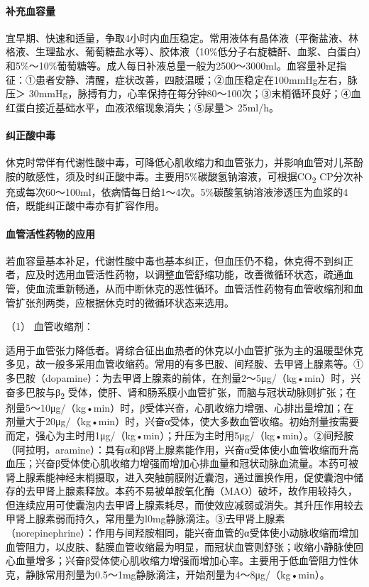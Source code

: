 \paragraph{补充血容量}

宜早期、快速和适量，争取4小时内血压稳定。常用液体有晶体液（平衡盐液、林格液、生理盐水、葡萄糖盐水等）、胶体液（10\%低分子右旋糖酐、血浆、白蛋白）和5\%～10\%葡萄糖等。成人每日补液总量一般为2500～3000ml。血容量补足指征：①患者安静、清醒，症状改善，四肢温暖；②血压稳定在100mmHg左右，脉压＞
30mmHg，脉搏有力，心率保持在每分钟80～100次；③末梢循环良好；④血红蛋白接近基础水平，血液浓缩现象消失；⑤尿量＞
25ml/h。

\paragraph{纠正酸中毒}

休克时常伴有代谢性酸中毒，可降低心肌收缩力和血管张力，并影响血管对儿茶酚胺的敏感性，须及时纠正酸中毒。主要用5\%碳酸氢钠溶液，可根据CO\textsubscript{2}
CP分次补充或每次60～100ml，依病情每日给1～4次。5\%碳酸氢钠溶液渗透压为血浆的4倍，既能纠正酸中毒亦有扩容作用。

\paragraph{血管活性药物的应用}

若血容量基本补足，代谢性酸中毒也基本纠正，但血压仍不稳，休克得不到纠正者，应及时选用血管活性药物，以调整血管舒缩功能，改善微循环状态，疏通血管，使血流重新畅通，从而中断休克的恶性循环。血管活性药物有血管收缩剂和血管扩张剂两类，应根据休克时的微循环状态来选用。

\hypertarget{text00223.htmlux5cux23CHP7-7-3-2-3-1}{}
（1） 血管收缩剂：

适用于血管张力降低者。肾综合征出血热者的休克以小血管扩张为主的温暖型休克多见，故一般多采用血管收缩药。常用的有多巴胺、间羟胺、去甲肾上腺素等。①多巴胺（dopamine）：为去甲肾上腺素的前体，在剂量2～5μg/（kg•min）时，兴奋多巴胺与β\textsubscript{2}
受体，使肝、肾和肠系膜小血管扩张，而脑与冠状动脉则扩张；在剂量5～10μg/（kg•min）时，β受体兴奋，心肌收缩力增强、心排出量增加；在剂量大于20μg/（kg•min）时，兴奋α受体，使大多数血管收缩。初始剂量按需要而定，强心为主时用1μg/（kg•min）；升压为主时用5μg/（kg•min）。②间羟胺（阿拉明，aramine）：具有α和β肾上腺素能作用，兴奋α受体使小血管收缩而升高血压；兴奋β受体使心肌收缩力增强而增加心排血量和冠状动脉血流量。本药可被肾上腺素能神经末梢摄取，进入突触前膜附近囊泡，通过置换作用，促使囊泡中储存的去甲肾上腺素释放。本药不易被单胺氧化酶（MAO）破坏，故作用较持久，但连续应用可使囊泡内去甲肾上腺素耗尽，而使效应减弱或消失。其升压作用较去甲肾上腺素弱而持久，常用量为l0mg静脉滴注。③去甲肾上腺素（norepinephrine）：作用与间羟胺相同，能兴奋血管的α受体使小动脉收缩而增加血管阻力，以皮肤、黏膜血管收缩最为明显，而冠状血管则舒张；收缩小静脉使回心血量增多；兴奋β受体使心肌收缩力增强而增加心率。主要用于低血管阻力性休克，静脉常用剂量为0.5～1mg静脉滴注，开始剂量为4～8μg/（kg•min）。

